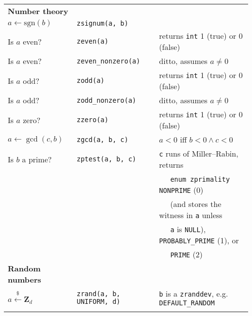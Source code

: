 \documentclass[10pt,draft]{article}
\begin{document}
\begin{tabular}{lll}
\textbf{Number theory}        & {}                         & {}                                                \\
$a \gets \mbox{sgn}(b)$       & {\tt zsignum(a, b)}        &                                                   \\
Is $a$ even?                  & {\tt zeven(a)}             & returns {\tt int} 1 (true) or 0 (false)           \\
Is $a$ even?                  & {\tt zeven\_nonzero(a)}    & ditto, assumes $a \neq 0$                         \\
Is $a$ odd?                   & {\tt zodd(a)}              & returns {\tt int} 1 (true) or 0 (false)           \\
Is $a$ odd?                   & {\tt zodd\_nonzero(a)}     & ditto, assumes $a \neq 0$                         \\
Is $a$ zero?                  & {\tt zzero(a)}             & returns {\tt int} 1 (true) or 0 (false)           \\
$a \gets \gcd(c, b)$          & {\tt zgcd(a, b, c)}        & $a < 0$ iff $b < 0 \wedge c < 0$                  \\
Is $b$ a prime?               & {\tt zptest(a, b, c)}      & {\tt c} runs of Miller--Rabin, returns            \\
{}                            & {}                         & $~~~~~$ {\tt enum zprimality} {\tt NONPRIME} (0)  \\
{}                            & {}                         & $~~~~~$ (and stores the witness in {\tt a} unless \\
{}                            & {}                         & $~~~~~$ {\tt a} is {\tt NULL}),
                                                                     {\tt PROBABLY\_PRIME} (1), or             \\
{}                            & {}                         & $~~~~~$ {\tt PRIME} (2)                           \\

\textbf{Random numbers}       & {}                         & {}                                                \\
$a \xleftarrow{\$} \textbf{Z}_d $ & {\tt zrand(a, b, UNIFORM, d)}
& {\tt b} is a {\tt zranddev}, e.g. {\tt DEFAULT\_RANDOM} \\
\\


\end{tabular}
\end{document}
